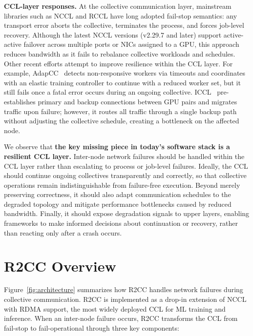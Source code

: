 \documentclass[letterpaper,twocolumn,10pt]{article}
\begin{document}
\smallskip\noindent\textbf{CCL-layer responses.} At the collective communication layer, mainstream libraries such as NCCL and RCCL have long adopted fail-stop semantics: any transport error aborts the collective, terminates the process, and forces job-level recovery. Although the latest NCCL versions (v2.29.7 and later) support active-active failover across multiple ports or NICs assigned to a GPU, this approach reduces bandwidth as it fails to rebalance collective workloads and schedules. 
Other recent efforts attempt to improve resilience within the CCL layer. For example, AdapCC~\cite{zhao2024adapcc} detects non-responsive workers via timeouts and coordinates with an elastic training controller to continue with a reduced worker set, but it still fails once a fatal error occurs during an ongoing collective. ICCL~\cite{chen2025efficient} pre-establishes primary and backup connections between GPU pairs and migrates traffic upon failure; however, it routes all traffic through a single backup path without adjusting the collective schedule, creating a bottleneck on the affected node.

We observe that \textbf{the key missing piece in today's software stack is a resilient CCL layer.}
Inter-node network failures should be handled within the CCL layer rather than escalating to process or job-level failures. Ideally, the CCL should continue ongoing collectives transparently and correctly, so that collective operations remain indistinguishable from failure-free execution. Beyond merely preserving correctness, it should also adapt communication schedules to the degraded topology and mitigate performance bottlenecks caused by reduced bandwidth. Finally, it should expose degradation signals to upper layers, enabling frameworks to make informed decisions about continuation or recovery, rather than reacting only after a crash occurs.




\section{R2CC Overview}

Figure~\ref{fig:architecture} summarizes how R2CC handles network failures during collective communication. R2CC is implemented as a drop-in extension of NCCL with RDMA support, the most widely deployed CCL for ML training and inference. When an inter-node failure occurs, R2CC transforms the CCL from fail-stop to fail-operational through three key components:
\end{document}
